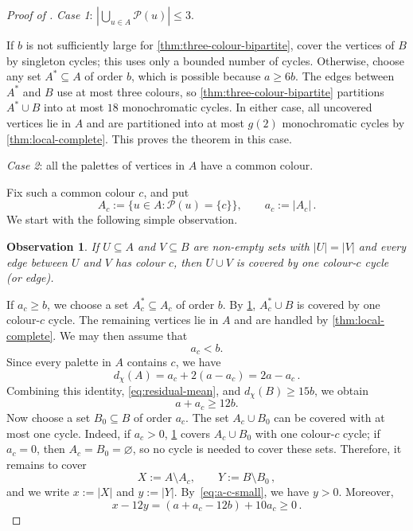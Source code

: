 \documentclass[a4paper,12pt,reqno]{amsart}
\newtheorem{observation}[theorem]{Observation}
\newcommand{\cP}{\mathcal P}
\newcommand{\dd}{d_{\chi}}
\begin{document}
\begin{proof}[Proof of ]
\vspace{0.2cm}
\noindent\textit{Case 1}: $|\bigcup_{u\in A}\cP(u)|\le3$.

If $b$ is not sufficiently large for \cref{thm:three-colour-bipartite}, cover
the vertices of $B$ by singleton cycles; this uses only a bounded number of
cycles. Otherwise, choose any set $A^*\subseteq A$ of order $b$, which is
possible because $a\ge6b$. The edges between $A^*$ and $B$ use at most three
colours, so \cref{thm:three-colour-bipartite} partitions $A^*\cup B$ into at
most $18$ monochromatic cycles. In either case, all uncovered vertices lie in
$A$ and are partitioned into at most $g(2)$ monochromatic cycles by
\cref{thm:local-complete}. This proves the theorem in this case.


\vspace{0.2cm}
\noindent\textit{Case 2}: all the palettes of vertices in $A$ have a common colour.

Fix such a common colour $c$, and put
\[
  A_c:=\{u\in A\colon\cP(u)=\{c\}\},\qquad a_c:=|A_c|\,.
\]
We start with the following simple observation.
\begin{observation}\label{obs:monochromatic-biclique}
If $U\subseteq A$ and $V\subseteq B$ are non-empty sets with $|U|=|V|$ and
every edge between $U$ and $V$ has colour $c$, then $U\cup V$ is covered by one
colour-$c$ cycle (or edge).
\end{observation}

If $a_c\ge b$, we choose a set $A_c^*\subseteq A_c$ of order $b$. By
\cref{obs:monochromatic-biclique}, $A_c^*\cup B$ is covered by one colour-$c$
cycle. The remaining vertices lie in $A$ and are handled by
\cref{thm:local-complete}. We may then assume that
\begin{equation}\label{eq:a-c-small}
  a_c<b.
\end{equation}
Since every palette in $A$ contains $c$, we have
\[
  \dd(A)=a_c+2(a-a_c)=2a-a_c\,.
\]
Combining this identity, \eqref{eq:residual-mean}, and
$\dd(B)\ge15b$, we obtain
\[
  a+a_c\ge12b.
\]
Now choose a set $B_0\subseteq B$ of order $a_c$. The set $A_c\cup B_0$ can be
covered with at most one cycle. Indeed, if $a_c>0$,
\cref{obs:monochromatic-biclique} covers $A_c\cup B_0$ with one colour-$c$
cycle; if $a_c=0$, then $A_c=B_0=\varnothing$, so no cycle is needed to cover
these sets. Therefore, it remains to cover 
\[
  X:=A\setminus A_c,\qquad Y:=B\setminus B_0\,,
\]
and we write $x:=|X|$ and $y:=|Y|$. By~\eqref{eq:a-c-small}, we have $y>0$.
Moreover,
\begin{equation}\label{eq:peeled-ratio}
  x-12y=(a+a_c-12b)+10a_c\ge0\,.
\end{equation}


\end{proof}
\end{document}
